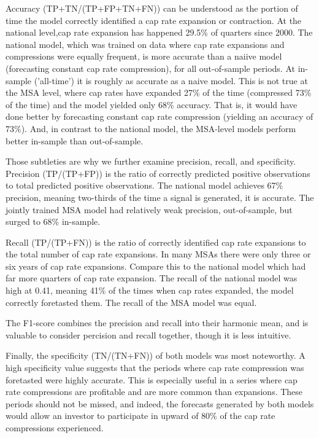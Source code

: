 Accuracy (TP+TN/(TP+FP+TN+FN)) can be understood as the portion of time the model correctly identified a cap rate expansion or contraction. At the national level,cap rate expansion has happened 29.5\% of quarters since 2000. The national model, which was trained on data where cap rate expansions and compressions were equally frequent, is more accurate than a naiive model (forecasting constant cap rate compression), for all out-of-sample periods. At in-sample ('all-time') it is roughly as accurate as a naive model. This is not true at the MSA level, where cap rates have expanded 27\% of the time (compressed 73\% of the time) and the model yielded only 68\% accuracy. That is, it would have done better by forecasting constant cap rate compression (yielding an accuracy of 73\%). And, in contrast to the national  model, the MSA-level models perform better in-sample than out-of-sample.

Those subtleties are why we further examine precision, recall, and specificity. Precision (TP/(TP+FP)) is the ratio of correctly predicted positive observations to total predicted positive observations. The national model achieves 67\% precision, meaning two-thirds of the time a signal is generated, it is accurate. The jointly trained MSA model had relatively weak precision, out-of-sample, but surged to 68\% in-sample. 

Recall (TP/(TP+FN)) is the ratio of correctly identified cap rate expansions to the total number of cap rate expansions. In many MSAs there were only three or six years of cap rate expansions. Compare this to the national model which had far more quarters of cap rate expansion. The recall of the national model was high at 0.41, meaning 41\% of the times when cap rates expanded, the model correctly foretasted them. The recall of the MSA model was equal.

The F1-score combines the precision and recall into their harmonic mean, and is valuable to consider percision and recall together, though it is less intuitive. 

Finally, the specificity (TN/(TN+FN)) of both models was most noteworthy. A high specificity value suggests that the periods where cap rate compression was foretasted were highly accurate. This is especially useful in a series where cap rate compressions are profitable and are more common than expansions. These periods should not be missed, and indeed, the forecasts generated by both models would allow an investor to participate in upward of 80\% of the cap rate compressions experienced.



